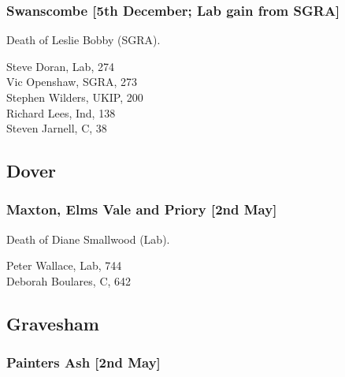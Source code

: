 \documentclass[a4paper,openany,10pt]{book}
\begin{document}
\subsubsection*{Swanscombe \hspace*{\fill}\nolinebreak[1]%
\enspace\hspace*{\fill}
[5th December; Lab gain from SGRA]}


Death of Leslie Bobby (SGRA).



Steve Doran, Lab, 274\\
Vic Openshaw, SGRA, 273\\
Stephen Wilders, UKIP, 200\\
Richard Lees, Ind, 138\\
Steven Jarnell, C, 38\\


\subsection*{Dover}

\subsubsection*{Maxton, Elms Vale and Priory \hspace*{\fill}\nolinebreak[1]%
\enspace\hspace*{\fill}
[2nd May]}


Death of Diane Smallwood (Lab).



Peter Wallace, Lab, 744\\
Deborah Boulares, C, 642\\


\subsection*{Gravesham}

\subsubsection*{Painters Ash \hspace*{\fill}\nolinebreak[1]%
\enspace\hspace*{\fill}
[2nd May]}
\end{document}
